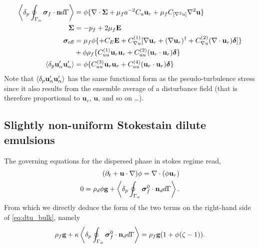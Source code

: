 \begin{align*}
    \left<\delta_{p} \oint_{\Gamma_{\alpha}} \bm\sigma_f\cdot \textbf{n} d\Gamma\right> &= 
     \phi \{
    \mathbf{\nabla}\cdot \bm\Sigma
    + 
    \mu_f a^{-2}
    C_u \textbf{u}_{r}
    +\mu_f C_{[\mathbf{\nabla}^2 u]} \mathbf{\nabla}^2 \textbf{u}
    \} 
    \\
    \bm\Sigma &= - p_f +2 \mu_f \textbf{E}\\
    \bm\sigma_\text{eff} &= 
    \mu_f \phi 
    \{ 
    + C_E  \textbf{E}
    +  C_{\mathbf{\nabla} u}^{(1)} [\mathbf{\nabla} \textbf{u}_{r} +(\mathbf{\nabla} \textbf{u}_{r})^\dagger + C_{\mathbf{\nabla} u}^{(2)}(\mathbf{\nabla}\cdot  \textbf{u}_{r})\bm\delta] \}\\
    &+\phi \rho_f \{ C_{uu}^{(1)}
    \textbf{u}_{r}\textbf{u}_{r} 
    + C_{uu}^{(2)} (\textbf{u}_{r}\cdot \textbf{u}_{r}) \bm\delta \}\\
    \left<\delta_{p} \textbf{u}_\alpha'\textbf{u}_\alpha'\right> &= 
    \phi \{ C_{uu}^{(3)}
    \textbf{u}_{r}\textbf{u}_{r} 
    + C_{uu}^{(4)} (\textbf{u}_{r}\cdot \textbf{u}_{r}) \bm\delta \}
\end{align*}
Note that $\left<\delta_{p} \textbf{u}_\alpha'\textbf{u}_\alpha'\right>$ has the same functional form as the pseudo-turbulence stress since it also results from the ensemble average of a disturbance field (that is therefore proportional to $\textbf{u}_r$, $\textbf{u}$, and so on \ldots). 
















\subsection{Slightly non-uniform Stokestain dilute emulsions}

The governing equations for the dispersed phase in stokes regime read,
\begin{align}
    (\partial_t + \textbf{u} \cdot \mathbf{\nabla})\phi = \mathbf{\nabla}\cdot(\phi \textbf{u}_r)\\
    0 
    = 
    \rho_d \phi \textbf{g}
    + \left<\delta_{p} \oint_{\Gamma_{\alpha}} {\bm{\sigma}_f^0 \cdot \textbf{n}_d} d\Gamma\right>. 
\end{align}
From which we directly deduce the form of the two terms on the right-hand side of \ref{eq:dtu_bulk}, namely
\begin{equation*}
    \rho_f \textbf{g} 
    + \kappa
    \left<\delta_{p} \oint_{\Gamma_{\alpha}} {\bm{\sigma}_f^0 \cdot \textbf{n}_d} d\Gamma\right>
    = \rho_f \textbf{g}(1 + \phi(\zeta-1) ). 
\end{equation*}

